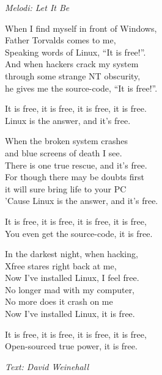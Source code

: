 {\footnotesize\textit{Melodi: Let It Be}}\par
\vspace{10pt}
When I find myself in front of Windows,\\
Father Torvalds comes to me,\\
Speaking words of Linux, ``It is free!''.\\
And when hackers crack my system\\
through some strange NT obscurity,\\
he gives me the source-code, ``It is free!''.\par
\vspace{7pt}
It is free, it is free, it is free, it is free.\\
Linux is the answer, and it's free.\par
\vspace{7pt}
When the broken system crashes\\
and blue screens of death I see.\\
There is one true rescue, and it's free.\\
For though there may be doubts first\\
it will sure bring life to your PC\\
'Cause Linux is the answer, and it's free.\par
\vspace{7pt}
It is free, it is free, it is free, it is free,\\
You even get the source-code, it is free.\par
\vspace{7pt}
In the darkest night, when hacking,\\
Xfree stares right back at me,\\
Now I've installed Linux, I feel free.\\
No longer mad with my computer,\\
No more does it crash on me\\
Now I've installed Linux, it is free.\par
\vspace{7pt}
It is free, it is free, it is free, it is free,\\
Open-sourced true power, it is free.\par
\vspace{10pt}
{\footnotesize\textit{Text: David Weinehall}}
